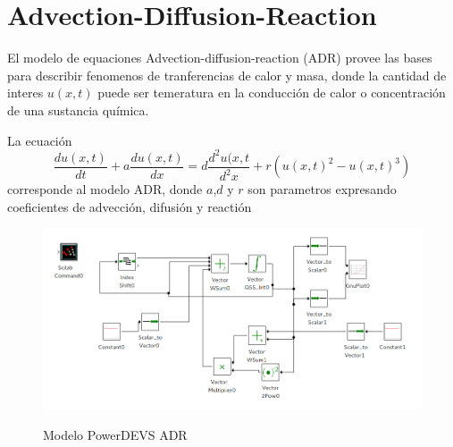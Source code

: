 \section{Advection-Diffusion-Reaction}
	El modelo de equaciones Advection-diffusion-reaction (ADR) provee las bases para describir fenomenos de tranferencias de calor y masa, donde la cantidad de interes $u(x,t)$ puede ser temeratura en la conducción de calor o concentración de una sustancia química.

La ecuación 
\begin{equation*}
\frac{du(x,t)}{dt} + a \frac{du(x,t)}{dx} = d\frac{d^2u(x,t}{d^2x} + r(u(x,t)^2 - u(x,t)^3)
\end{equation*}
corresponde al modelo ADR, donde $a$,$d$ y $r$ son parametros expresando coeficientes de advección, difusión y reactión

\begin{figure}[H]
 \includegraphics[width=0.75\linewidth]{adr-pwd}
\label{model:adr}
\caption{Modelo PowerDEVS ADR}
\end{figure}

